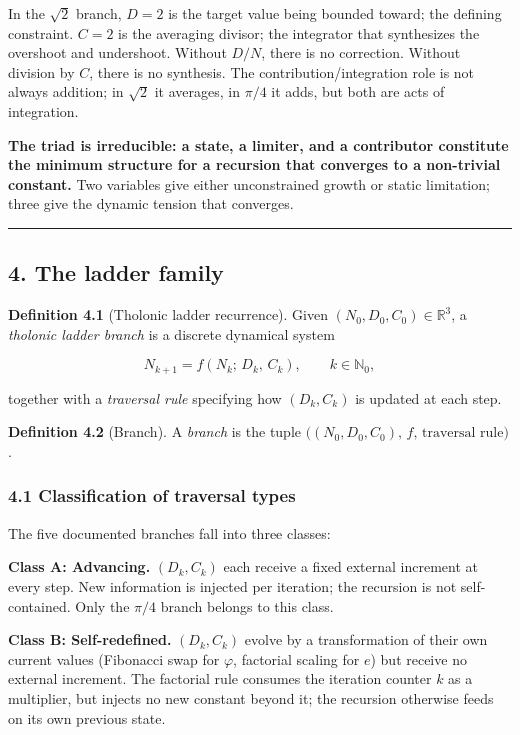 \documentclass[
  11pt,
  letterpaper,
]{article}
\begin{document}
In the \(\sqrt{2}\) branch, \(D = 2\) is the target value being bounded
toward; the defining constraint. \(C = 2\) is the averaging divisor; the
integrator that synthesizes the overshoot and undershoot. Without
\(D/N\), there is no correction. Without division by \(C\), there is no
synthesis. The contribution/integration role is not always addition; in
\(\sqrt{2}\) it averages, in \(\pi/4\) it adds, but both are acts of
integration.

\textbf{The triad is irreducible: a state, a limiter, and a contributor
constitute the minimum structure for a recursion that converges to a
non-trivial constant.} Two variables give either unconstrained growth or
static limitation; three give the dynamic tension that converges.

\begin{center}\rule{0.5\linewidth}{0.5pt}\end{center}

\subsection{4. The ladder family}\label{the-ladder-family}

\textbf{Definition 4.1} (Tholonic ladder recurrence). Given
\((N_0, D_0, C_0) \in \mathbb{R}^3\), a \emph{tholonic ladder branch} is
a discrete dynamical system

\[N_{k+1} = f(N_k;\, D_k,\, C_k), \qquad k \in \mathbb{N}_0,\]

together with a \emph{traversal rule} specifying how \((D_k, C_k)\) is
updated at each step.

\textbf{Definition 4.2} (Branch). A \emph{branch} is the tuple
\(\bigl((N_0, D_0, C_0),\, f,\, \text{traversal rule}\bigr)\).

\subsubsection{4.1 Classification of traversal
types}\label{classification-of-traversal-types}

The five documented branches fall into three classes:

\textbf{Class A: Advancing.} \((D_k, C_k)\) each receive a fixed
external increment at every step. New information is injected per
iteration; the recursion is not self-contained. Only the \(\pi/4\)
branch belongs to this class.

\textbf{Class B: Self-redefined.} \((D_k, C_k)\) evolve by a
transformation of their own current values (Fibonacci swap for
\(\varphi\), factorial scaling for \(e\)) but receive no external
increment. The factorial rule consumes the iteration counter \(k\) as a
multiplier, but injects no new constant beyond it; the recursion
otherwise feeds on its own previous state.
\end{document}
